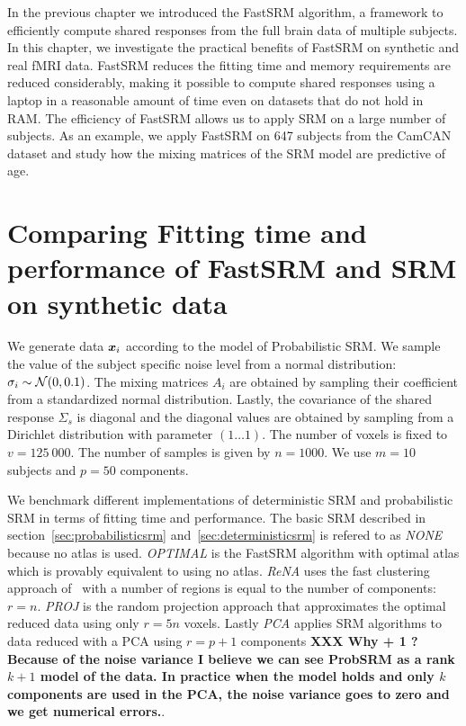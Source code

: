 In the previous chapter we introduced the FastSRM algorithm, a framework to
efficiently compute shared responses from the full brain data of multiple
subjects. In this chapter, we
investigate the practical benefits of FastSRM on synthetic and real fMRI data.
FastSRM reduces the fitting time
and memory requirements are reduced considerably, making it possible to compute
shared responses using a laptop in a reasonable amount of time even on
datasets that do not hold in RAM. The efficiency of FastSRM allows us to apply
SRM on a large number of subjects. As an example, we apply FastSRM on 647
subjects from the CamCAN dataset and study how the mixing matrices of the SRM
model are predictive of age.


\section{Comparing Fitting time and performance of FastSRM and
  SRM on synthetic data}
We generate data $\boldsymbol{x}_i$ according to the model of Probabilistic SRM. We sample the value of the subject specific noise level from a normal
distribution: $\sigma_i \sim \mathcal{N}(0, 0.1)$. The mixing matrices $A_i$
are obtained by sampling their coefficient from a standardized normal distribution.
Lastly, the covariance of the shared response $\Sigma_s$ is diagonal and the
diagonal values are obtained by sampling from a Dirichlet distribution with
parameter $(1 \dots 1)$.
The number of voxels is fixed to $v=125~000$. The number of samples is given by
$n=1000$. We use $m=10$ subjects and $p=50$ components.

We benchmark different implementations of deterministic SRM and probabilistic
SRM in terms of fitting time and performance. The basic SRM described in
section~\ref{sec:probabilisticsrm} and~\ref{sec:deterministicsrm} is refered to
as \emph{NONE} because no atlas is used. 
\emph{OPTIMAL} is the FastSRM algorithm with optimal atlas which is provably
equivalent to using no atlas. \emph{ReNA} uses the fast clustering approach
of~\cite{hoyos2018recursive} with a number of regions is equal to the number of
components: $r=n$. \emph{PROJ} is the random projection approach that
approximates the optimal reduced data using only $r=5n$ voxels. Lastly
\emph{PCA} applies SRM algorithms to data reduced with a PCA using $r=p+1$
components \textbf{XXX Why  + 1 ? Because of the noise variance I believe we can see ProbSRM as a
  rank $k+1$ model of the data. In practice when the model holds and only $k$
  components are used in the PCA, the noise variance goes to zero and we get numerical errors.}.

